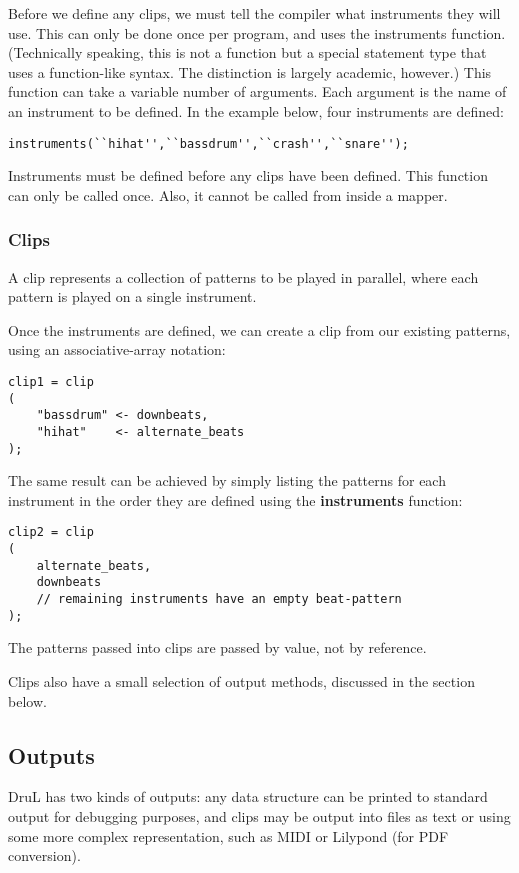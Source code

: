 Before we define any clips, we must tell the compiler what instruments they will use.
This can only be done once per program, and uses the instruments function.
(Technically speaking, this is not a function but a special statement type that uses a function-like syntax.  The distinction is largely academic, however.)
This function can take a variable number of arguments.  Each argument is the name of an instrument to be defined.  In the example below, four instruments are defined:

\begin{verbatim}
instruments(``hihat'',``bassdrum'',``crash'',``snare'');
\end{verbatim}

Instruments must be defined before any clips have been defined. This function
can only be called once. Also, it cannot be called from inside a mapper.

\subsubsection{Clips}

A clip represents a collection of patterns to be played in parallel, where each pattern is played on a single instrument.

Once the instruments are defined, we can create a clip from our existing patterns, using an
associative-array notation:

\begin{verbatim}
clip1 = clip
(
    "bassdrum" <- downbeats,
    "hihat"    <- alternate_beats
);
\end{verbatim}
The same result can be achieved by simply listing the patterns for each instrument in the order they are defined using the \textbf{instruments} function:
\begin{verbatim}
clip2 = clip
(
    alternate_beats,
    downbeats
    // remaining instruments have an empty beat-pattern
);

\end{verbatim}
The patterns passed into clips are passed by value, not by reference.

Clips also have a small selection of output methods, discussed in the section below.

\subsection{Outputs}

DruL has two kinds of outputs: any data structure can be printed to standard output for debugging purposes, and clips may be output into files as text or using some
more complex representation, such as MIDI or Lilypond (for PDF conversion).


